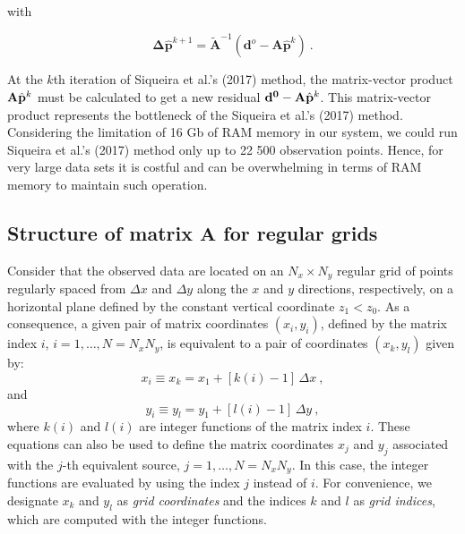 \documentclass[manuscript,revised]{geophysics}
\begin{document}
\noindent with

\begin{equation}
\mathbf{\Delta} \hat{\mathbf{p}}^{k+1} = \tilde{\mathbf{A}}^{-1} (\mathbf{d}^{o} - \mathbf{A} \hat{\mathbf{p}}^{k}) \: .
\label{eq:update_delta_m}
\end{equation}


At the $k$th iteration of Siqueira et al.'s (2017) method, the matrix-vector product $\tensor{A} \hat{\mathbf{p}}^{k}$ must be calculated to get a new residual $\mathbf{d^0} - \tensor{A} \hat{\mathbf{p}}^{k}$. This matrix-vector product represents  the bottleneck of the Siqueira et al.'s (2017) method. Considering the limitation of 16 Gb of RAM memory in our system, we could run  Siqueira et al.'s (2017) method only up to 22 500 observation points. Hence, for very large data sets it is costful and can be overwhelming in terms of RAM memory to maintain such operation.

\subsection{Structure of matrix $\mathbf{A}$ for regular grids}

Consider that the observed data are located on an $N_{x} \times N_{y}$ regular grid of
points regularly spaced from $\Delta x$ and $\Delta y$ along the $x$ and $y$ directions,
respectively, on a horizontal plane defined by the constant vertical coordinate $z_{1} < z_{0}$. 
As a consequence, a given pair of matrix coordinates $(x_{i}, y_{i})$, defined by the matrix index 
$i$, $i = 1, \dots, N = N_{x} N_{y}$, is equivalent to a pair of coordinates $(x_{k}, y_{l})$
given by:
\begin{equation}
x_{i} \equiv x_{k} = x_{1} + \left[ k(i) - 1 \right] \, \Delta x \: , 
\label{eq:xi}
\end{equation}
and
\begin{equation}
y_{i} \equiv y_{l} = y_{1} + \left[ l(i) - 1 \right] \, \Delta y \: ,
\label{eq:yi}
\end{equation}
where $k(i)$ and $l(i)$ are integer functions of the matrix index $i$.
These equations can also be used to define the matrix coordinates 
$x_{j}$ and $y_{j}$ associated with the $j$-th equivalent source,
$j = 1, \dots, N = N_{x}N_{y}$. In this case, the integer functions
are evaluated by using the index $j$ instead of $i$.
For convenience, we designate $x_{k}$ and $y_{l}$ as \textit{grid coordinates}
and the indices $k$ and $l$ as \textit{grid indices}, which are computed with
the integer functions.
\end{document}
